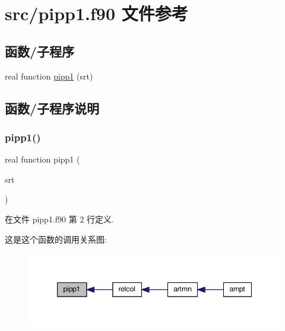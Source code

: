\hypertarget{pipp1_8f90}{}\section{src/pipp1.f90 文件参考}
\label{pipp1_8f90}
\subsection*{函数/子程序}
\begin{DoxyCompactItemize}
\item 
real function \mbox{\hyperlink{pipp1_8f90_ae0287d5c8477a60479f4a0e899b00c2a}{pipp1}} (srt)
\end{DoxyCompactItemize}


\subsection{函数/子程序说明}
\mbox{\label{pipp1_8f90_ae0287d5c8477a60479f4a0e899b00c2a}} 
\subsubsection{\texorpdfstring{pipp1()}{pipp1()}}
{\footnotesize\ttfamily real function pipp1 (\begin{DoxyParamCaption}\item[{}]{srt }\end{DoxyParamCaption})}



在文件 pipp1.\+f90 第 2 行定义.

这是这个函数的调用关系图\+:
\nopagebreak
\begin{figure}[H]
\begin{center}
\leavevmode
\includegraphics[width=347pt]{pipp1_8f90_ae0287d5c8477a60479f4a0e899b00c2a_icgraph}
\end{center}
\end{figure}
